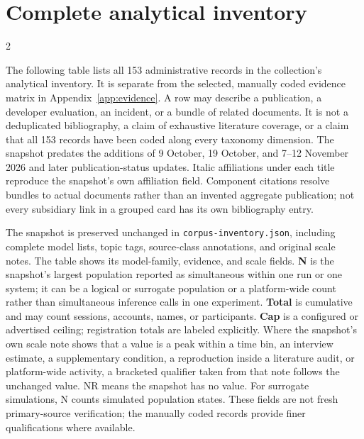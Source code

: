 \clearpage
\section{Complete analytical inventory}
\label{app:inventory}
\begin{multicols}{2}\raggedcolumns

The following table lists all 153 administrative records in the collection's analytical inventory. It is separate from the selected, manually coded evidence matrix in Appendix~\ref{app:evidence}. A row may describe a publication, a developer evaluation, an incident, or a bundle of related documents. It is not a deduplicated bibliography, a claim of exhaustive literature coverage, or a claim that all 153 records have been coded along every taxonomy dimension. The snapshot predates the additions of 9 October, 19 October, and 7--12 November 2026 and later publication-status updates. Italic affiliations under each title reproduce the snapshot's own affiliation field. Component citations resolve bundles to actual documents rather than an invented aggregate publication; not every subsidiary link in a grouped card has its own bibliography entry.

The snapshot is preserved unchanged in \texttt{corpus-inventory.json}, including complete model lists, topic tags, source-class annotations, and original scale notes. The table shows its model-family, evidence, and scale fields. \textbf{N} is the snapshot's largest population reported as simultaneous within one run or one system; it can be a logical or surrogate population or a platform-wide count rather than simultaneous inference calls in one experiment. \textbf{Total} is cumulative and may count sessions, accounts, names, or participants. \textbf{Cap} is a configured or advertised ceiling; registration totals are labeled explicitly. Where the snapshot's own scale note shows that a value is a peak within a time bin, an interview estimate, a supplementary condition, a reproduction inside a literature audit, or platform-wide activity, a bracketed qualifier taken from that note follows the unchanged value. NR means the snapshot has no value. For surrogate simulations, N counts simulated population states. These fields are not fresh primary-source verification; the manually coded records provide finer qualifications where available.
\end{multicols}

